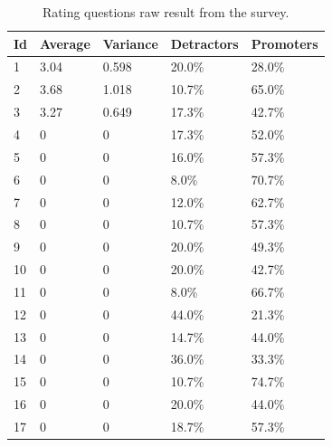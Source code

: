 \documentclass[a4paper,12pt]{article}
\begin{document}
    \begin{table}[!htbp]
        \begin{center}
            \begin{tabularx}{\textwidth}{lllll}
                \toprule
                Id & Average & Variance & Detractors & Promoters \\
                \midrule
                1  & 3.04    & 0.598    & 20.0\%     & 28.0\%    \\
                2  & 3.68    & 1.018    & 10.7\%     & 65.0\%    \\
                3  & 3.27    & 0.649    & 17.3\%     & 42.7\%    \\
                4  & 0       & 0        & 17.3\%     & 52.0\%    \\
                5  & 0       & 0        & 16.0\%     & 57.3\%    \\
                6  & 0       & 0        & 8.0\%      & 70.7\%    \\
                7  & 0       & 0        & 12.0\%     & 62.7\%    \\
                8  & 0       & 0        & 10.7\%     & 57.3\%    \\
                9  & 0       & 0        & 20.0\%     & 49.3\%    \\
                10 & 0       & 0        & 20.0\%     & 42.7\%    \\
                11 & 0       & 0        & 8.0\%      & 66.7\%    \\
                12 & 0       & 0        & 44.0\%     & 21.3\%    \\
                13 & 0       & 0        & 14.7\%     & 44.0\%    \\
                14 & 0       & 0        & 36.0\%     & 33.3\%    \\
                15 & 0       & 0        & 10.7\%     & 74.7\%    \\
                16 & 0       & 0        & 20.0\%     & 44.0\%    \\
                17 & 0       & 0        & 18.7\%     & 57.3\%    \\
                \bottomrule
            \end{tabularx}
        \end{center}
        \caption{\label{tab:ratingquestionresultstable} Rating questions raw result from the survey.}
    \end{table}
\end{document}
